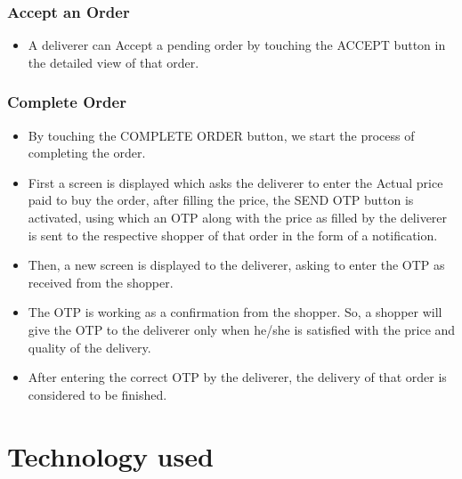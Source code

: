 \documentclass{report}
\begin{document}
\subsection{Accept an Order}
\begin{itemize}
\item A deliverer can Accept a pending order by touching the ACCEPT button in the detailed view of that order.
\end{itemize}

\subsection{Complete Order}
\begin{itemize}
\item By touching the COMPLETE ORDER button, we start the process of completing the order.
\item First a screen is displayed which asks the deliverer to enter the Actual price paid to buy the order, after filling the price, the SEND OTP button is activated, using which an OTP along with the price as filled by the deliverer is sent to the respective shopper of that order in the form  of a notification.
\item Then, a new screen is displayed to the deliverer, asking to enter the OTP as received from the shopper.
\item The OTP is working as a confirmation from the shopper. So, a shopper will give the OTP to the deliverer only when he/she is satisfied with the price and quality of the delivery.
\item After entering the correct OTP by the deliverer, the delivery of that order is considered to be finished.
\end{itemize}

\chapter{Technology used}
\end{document}
